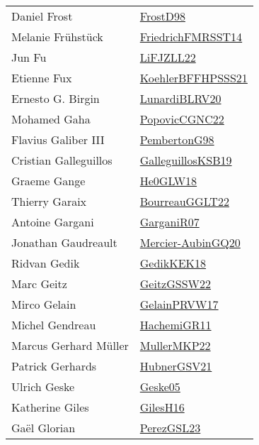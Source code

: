 {\begin{longtable}{p{4cm}p{20cm}}
Daniel Frost & \href{papers/FrostD98.pdf}{FrostD98}\cite{FrostD98} \\
Melanie Fr{\"{u}}hst{\"{u}}ck & \href{}{FriedrichFMRSST14}\cite{FriedrichFMRSST14} \\
Jun Fu & \href{papers/LiFJZLL22.pdf}{LiFJZLL22}\cite{LiFJZLL22} \\
Etienne Fux & \href{articles/KoehlerBFFHPSSS21.pdf}{KoehlerBFFHPSSS21}\cite{KoehlerBFFHPSSS21} \\
Ernesto G. Birgin & \href{articles/LunardiBLRV20.pdf}{LunardiBLRV20}\cite{LunardiBLRV20} \\
Mohamed Gaha & \href{papers/PopovicCGNC22.pdf}{PopovicCGNC22}\cite{PopovicCGNC22} \\
Flavius Galiber III & \href{papers/PembertonG98.pdf}{PembertonG98}\cite{PembertonG98} \\
Cristian Galleguillos & \href{papers/GalleguillosKSB19.pdf}{GalleguillosKSB19}\cite{GalleguillosKSB19} \\
Graeme Gange & \href{papers/He0GLW18.pdf}{He0GLW18}\cite{He0GLW18} \\
Thierry Garaix & \href{articles/BourreauGGLT22.pdf}{BourreauGGLT22}\cite{BourreauGGLT22} \\
Antoine Gargani & \href{papers/GarganiR07.pdf}{GarganiR07}\cite{GarganiR07} \\
Jonathan Gaudreault & \href{papers/Mercier-AubinGQ20.pdf}{Mercier-AubinGQ20}\cite{Mercier-AubinGQ20} \\
Ridvan Gedik & \href{articles/GedikKEK18.pdf}{GedikKEK18}\cite{GedikKEK18} \\
Marc Geitz & \href{papers/GeitzGSSW22.pdf}{GeitzGSSW22}\cite{GeitzGSSW22} \\
Mirco Gelain & \href{papers/GelainPRVW17.pdf}{GelainPRVW17}\cite{GelainPRVW17} \\
Michel Gendreau & \href{articles/HachemiGR11.pdf}{HachemiGR11}\cite{HachemiGR11} \\
Marcus Gerhard M{\"{u}}ller & \href{articles/MullerMKP22.pdf}{MullerMKP22}\cite{MullerMKP22} \\
Patrick Gerhards & \href{articles/HubnerGSV21.pdf}{HubnerGSV21}\cite{HubnerGSV21} \\
Ulrich Geske & \href{papers/Geske05.pdf}{Geske05}\cite{Geske05} \\
Katherine Giles & \href{papers/GilesH16.pdf}{GilesH16}\cite{GilesH16} \\
Ga{\"{e}}l Glorian & \href{papers/PerezGSL23.pdf}{PerezGSL23}\cite{PerezGSL23} \\

\end{longtable}}
